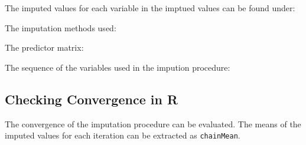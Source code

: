 \documentclass[
]{book}
\newenvironment{Shaded}{\begin{snugshade}}{\end{snugshade}}
\newcommand{\NormalTok}[1]{#1}
\newcommand{\OperatorTok}[1]{\textcolor[rgb]{0.81,0.36,0.00}{\textbf{#1}}}
\begin{document}
The imputed values for each variable in the imptued values can be found
under:

\begin{Shaded}
\end{Shaded}

The imputation methods used:

\begin{Shaded}
\end{Shaded}

The predictor matrix:

\begin{Shaded}
\end{Shaded}

The sequence of the variables used in the impution procedure:

\begin{Shaded}
\end{Shaded}

\hypertarget{checking-convergence-in-r}{%
\subsection{Checking Convergence in R}\label{checking-convergence-in-r}}

The convergence of the imputation procedure can be evaluated. The means
of the imputed values for each iteration can be extracted as
\texttt{chainMean}.

\begin{Shaded}
\end{Shaded}
\end{document}
